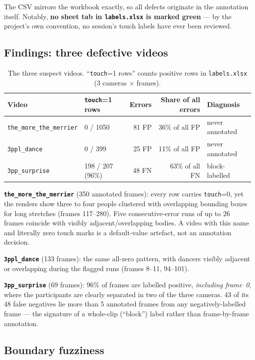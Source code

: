 \documentclass[11pt, a4paper]{article}
\begin{document}
The CSV mirrors the workbook exactly, so all defects originate in the annotation
itself. Notably, \textbf{no sheet tab in \texttt{labels.xlsx} is marked green} --- by the
project's own convention, no session's touch labels have ever been reviewed.

\subsection{Findings: three defective videos}

\begin{table}[H]
\centering
\footnotesize
\begin{tabular}{llrrl}
\toprule
Video & \texttt{touch}=1 rows & Errors & Share of all errors & Diagnosis \\
\midrule
\texttt{the\_more\_the\_merrier} & 0 / 1050 & 81 FP & 36\% of all FP &
    never annotated \\
\texttt{3ppl\_dance} & 0 / 399 & 25 FP & 11\% of all FP &
    never annotated \\
\texttt{3pp\_surprise} & 198 / 207 (96\%) & 48 FN & 63\% of all FN &
    block-labelled \\
\bottomrule
\end{tabular}
\caption{The three suspect videos. ``\texttt{touch}=1 rows'' counts positive rows in
\texttt{labels.xlsx} (3 cameras $\times$ frames).}
\end{table}

\textbf{\texttt{the\_more\_the\_merrier}} (350 annotated frames): every row carries
\texttt{touch}=0, yet the renders show three to four people clustered with overlapping
bounding boxes for long stretches (frames 117--280). Five consecutive-error runs of up to
26 frames coincide with visibly adjacent/overlapping bodies. A video with this name and
literally zero touch marks is a default-value artefact, not an annotation decision.

\textbf{\texttt{3ppl\_dance}} (133 frames): the same all-zero pattern, with dancers
visibly adjacent or overlapping during the flagged runs (frames 8--11, 94--101).

\textbf{\texttt{3pp\_surprise}} (69 frames): 96\% of frames are labelled positive,
\emph{including frame~0}, where the participants are clearly separated in two of the
three cameras. 43 of its 48 false negatives lie more than 5 annotated frames from any
negatively-labelled frame --- the signature of a whole-clip (``block'') label rather than
frame-by-frame annotation.

\subsection{Boundary fuzziness}
\end{document}
